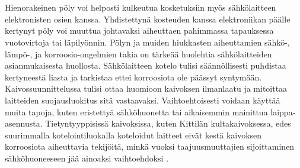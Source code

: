 \documentclass[finnish,12pt,a4paper,pdftex,elec,utf8]{aaltothesis}
\begin{document}
\\\\
Hienorakeinen pöly voi helposti kulkeutua kosketuksiin myös sähkölaitteen elektronisten osien kanssa. Yhdistettynä kosteuden kanssa elektroniikan päälle kertynyt pöly voi muuttua johtavaksi aiheuttaen pahimmassa tapauksessa vuotovirtoja tai läpilyönnin. \cite{Pallasmaa} Pölyn ja muiden hiukkasten aiheuttamien sähkö-, lämpö-, ja korroosio-ongelmien takia on tärkeää huolehtia sähkölaitteiden asianmukaisesta huollosta. Sähkölaitteen kotelo tulisi säännöllisesti puhdistaa kertyneestä liasta ja tarkistaa ettei korroosiota ole päässyt syntymään. Kaivossuunnittelussa tulisi ottaa huomioon kaivoksen ilmanlaatu ja mitoittaa laitteiden suojausluokitus sitä vastaavaksi. Vaihtoehtoisesti voidaan käyttää muita tapoja, kuten eristettyä sähköhuonetta tai aikaisemmin mainittua laippa-asennusta. Tietyntyyppisissä kaivoksissa, kuten Kittilän kultakaivoksessa, edes suurimmalla kotelointiluokalla koteloidut laitteet eivät kestä kaivoksen korroosiota aiheuttavia tekijöitä, minkä vuoksi taajuusmuuttajien sijoittaminen sähköhuoneeseen jää ainoaksi vaihtoehdoksi \cite{MyyntiHaastattelu}.

\end{document}
